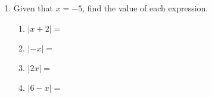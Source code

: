 \begin{enumerate}
\item Given that $x=-5$, find the value of each expression. \bigskip
  \begin{multicols}{2} 
    \begin{enumerate}[itemsep=1cm]
      \item $|x+2|=$
      \item $|-x|=$
      \item $|2x|=$
      \item $|6-x|=$
    \end{enumerate}
  \end{multicols}


\end{enumerate}
